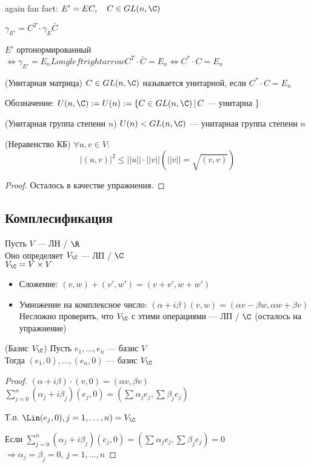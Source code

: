 again fan fact:
$E' = EC, \quad C \in GL(n, \C)$

$\gamma_{E'} = C^T \cdot \gamma_E \bar{C}$

$E'$ ортонормированный $\Longleftrightarrow \gamma_{E'} = E_n Longleftrightarrow C^T \cdot \bar{C} = E_n \Longleftrightarrow C^* \cdot C = E_n$

\begin{conj}(Унитарная матрица)
    $C \in GL(n, \C)$ называется унитарной, если $C^* \cdot C = E_n$
\end{conj}

Обозначение: $U(n, \C) := U(n) := \{ C \in GL(n, \C) \, | \, C$ --- унитарна \}

\begin{theorem}(Унитарная группа степени $n$)
    $U(n) < GL(n, \C)$ --- унитарная группа степени $n$
\end{theorem}

\begin{theorem}(Неравенство КБ)
    $\forall u,v \in V:$
    $$
        |(u, v)|^2 \leqslant ||u|| \cdot ||v|| (||v|| = \sqrt{(v, v)})
    $$
    \begin{proof}
    \emptyln
    Осталось в качестве упражнения.
    \end{proof}
\end{theorem}

\subsection*{Комплесификация}

Пусть $V$ --- ЛН / $\R$ \\
Оно определяет $V_{\C}$ --- ЛП / $\C$ \\
$V_{\C} = V \times V$ \\

\begin{itemize}
    \item Сложение: $(v, w) + (v', w') = (v + v', w + w')$
    \item Умножение на комплексное число: $(\alpha + i \beta)(v, w) = (\alpha v - \beta w, \alpha w + \beta v)$
    Несложно проверить, что $V_{\C}$ с этими операциями --- ЛП / $\C$ (осталось на упражнение)
\end{itemize}

\begin{theorem}(Базис $V_{\C}$)
    Пусть $e_1, \dots, e_n$ --- базис $V$ \\
    Тогда $(e_1, 0), \dots, (e_n, 0)$ --- базис $V_{\C}$

    \begin{proof}
    \emptyln
    $(\alpha + i \beta) \cdot (v, 0) = (\alpha v, \beta v)$
    $\sum_{j=0}^{n} (\alpha_j + i \beta_j)(e_j, 0) = (\sum_{}^{} \alpha_j e_j, \sum_{}^{} \beta_j e_j)$

    Т.о. $\Lin(e_j, 0), j = 1, \dots, n) = V_{\C}$

    Если $\sum_{j=0}^{n} (\alpha_j + i \beta_j)(e_j, 0) = (\sum_{}^{} \alpha_j e_j, \sum_{}^{} \beta_j e_j) = 0$ \\
    $\Longrightarrow \alpha_j = \beta_j = 0, \, j = 1, \dots, n$
    \end{proof}
\end{theorem}

